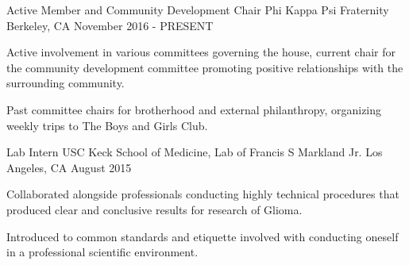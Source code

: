 \documentclass[11pt, a4paper]{awesome-cv}
\begin{document}


\begin{cventries}

  \cventry
    {Active Member and Community Development Chair} %
    {Phi Kappa Psi Fraternity} %
    {Berkeley, CA} %
    {November 2016 - PRESENT} %
    {
      \begin{cvitems} %
        \item {Active involvement in various committees governing the house, current chair for the community development committee promoting positive relationships with the surrounding community.}
        \item {Past committee chairs for brotherhood and external philanthropy, organizing weekly trips to The Boys and Girls Club.}
      \end{cvitems}
    }

  \cventry
    {Lab Intern} %
    {USC Keck School of Medicine, Lab of Francis S Markland Jr.} %
    {Los Angeles, CA} %
    {August 2015} %
    {
      \begin{cvitems} %
        \item {Collaborated alongside professionals conducting highly technical procedures that produced clear and conclusive results for research of Glioma.}
        \item {Introduced to common standards and etiquette involved with conducting oneself in a professional scientific environment.}
      \end{cvitems}
    }

\end{cventries}

\end{document}
